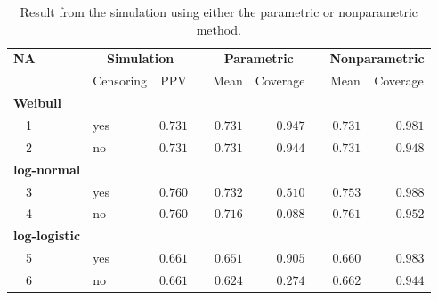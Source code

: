 \begin{table}[!tbp]
\caption{Result from the simulation using either the parametric or nonparametric method.\label{}} 
\begin{center}
\begin{tabular}{llrcrrcrr}
\hline\hline
\multicolumn{1}{l}{\bfseries NA}&\multicolumn{2}{c}{\bfseries Simulation}&\multicolumn{1}{c}{\bfseries }&\multicolumn{2}{c}{\bfseries Parametric}&\multicolumn{1}{c}{\bfseries }&\multicolumn{2}{c}{\bfseries Nonparametric}\tabularnewline
\cline{2-3} \cline{5-6} \cline{8-9}
\multicolumn{1}{l}{}&\multicolumn{1}{c}{Censoring}&\multicolumn{1}{c}{PPV}&\multicolumn{1}{c}{}&\multicolumn{1}{c}{Mean}&\multicolumn{1}{c}{Coverage}&\multicolumn{1}{c}{}&\multicolumn{1}{c}{Mean}&\multicolumn{1}{c}{Coverage}\tabularnewline
\hline
{\bfseries Weibull}&&&&&&&&\tabularnewline
~~1&yes&$0.731$&&$0.731$&$0.947$&&$0.731$&$0.981$\tabularnewline
~~2&no&$0.731$&&$0.731$&$0.944$&&$0.731$&$0.948$\tabularnewline
\hline
{\bfseries log-normal}&&&&&&&&\tabularnewline
~~3&yes&$0.760$&&$0.732$&$0.510$&&$0.753$&$0.988$\tabularnewline
~~4&no&$0.760$&&$0.716$&$0.088$&&$0.761$&$0.952$\tabularnewline
\hline
{\bfseries log-logistic}&&&&&&&&\tabularnewline
~~5&yes&$0.661$&&$0.651$&$0.905$&&$0.660$&$0.983$\tabularnewline
~~6&no&$0.661$&&$0.624$&$0.274$&&$0.662$&$0.944$\tabularnewline
\hline
\end{tabular}\end{center}
\end{table}
